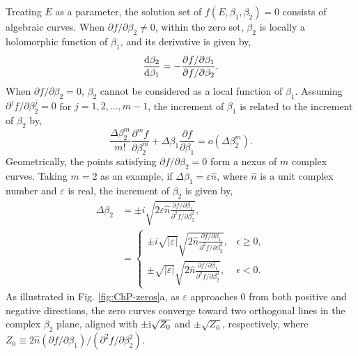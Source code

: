 \documentclass[pdflatex,sn-nature, iicol]{sn-jnl}%
\theoremstyle{thmstyleone}%
\theoremstyle{thmstyletwo}%
\theoremstyle{thmstylethree}%
\begin{document}
Treating $E$ as a parameter, the solution set of $f(E,\beta_{1},\beta_{2})=0$
consists of algebraic curves. When $\partial f/\partial\beta_{2}\neq0$,
within the zero set, $\beta_{2}$ is locally a holomorphic function
of $\beta_{1}$, and its derivative is given by, 
\begin{equation}
\frac{\mathrm{d}\beta_{2}}{\mathrm{d}\beta_{1}}=-\frac{\partial f/\partial\beta_{1}}{\partial f/\partial\beta_{2}}.
\end{equation}
When $\partial f/\partial\beta_{2}=0$, $\beta_{2}$ cannot be considered
as a local function of $\beta_{1}$. Assuming $\partial^{j}f/\partial\beta_{2}^{j}=0$
for $j=1,2,\dots,m-1$, the increment of $\beta_{1}$ is related to
the increment of $\beta_{2}$ by, 
\begin{equation}
\frac{\Delta\beta_{2}^{m}}{m!}\frac{\partial^{m}f}{\partial\beta_{2}^{m}}+\Delta\beta_{1}\frac{\partial f}{\partial\beta_{1}}=o\left(\Delta\beta_{2}^{m}\right).
\end{equation}
Geometrically, the points satisfying $\partial f/\partial\beta_{2}=0$
form a nexus of $m$ complex curves. Taking $m=2$ as an example,
if $\Delta\beta_{1}=\varepsilon\hat{n}$, where $\hat{n}$ is a unit
complex number and $\varepsilon$ is real, the increment of $\beta_{2}$
is given by, 
\begin{align*}
\Delta\beta_{2} & =\pm i\sqrt{2\varepsilon\hat{n}\frac{\partial f/\partial\beta_{1}}{\partial^{2}f/\partial\beta_{2}^{2}}},\\
 & =\begin{cases}
\pm i\sqrt{\left|\varepsilon\right|}\sqrt{2\hat{n}\frac{\partial f/\partial\beta_{1}}{\partial^{2}f/\partial\beta_{2}^{2}}}, & \epsilon\geq0,\\
\pm\sqrt{\left|\varepsilon\right|}\sqrt{2\hat{n}\frac{\partial f/\partial\beta_{1}}{\partial^{2}f/\partial\beta_{2}^{2}}}, & \epsilon<0.
\end{cases}
\end{align*}
As illustrated in Fig. \ref{fig:ChP-zeros}a, as $\varepsilon$ approaches
$0$ from both positive and negative directions, the zero curves converge
toward two orthogonal lines in the complex $\beta_{2}$ plane, aligned
with $\pm\mathrm{i}\sqrt{Z_{0}}$ and $\pm\sqrt{Z_{0}}$, respectively,
where $Z_{0}\equiv2\hat{n}\left(\partial f/\partial\beta_{1}\right)/\left(\partial^{2}f/\partial\beta_{2}^{2}\right)$.
\end{document}
